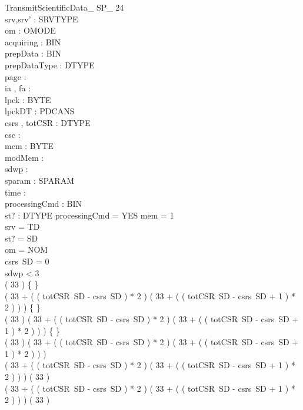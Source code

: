 \begin{schema}{TransmitScientificData\_ SP\_ 24}\\
 srv,srv' : SRVTYPE \\
 om : OMODE \\
 acquiring : BIN \\
 prepData : BIN \\
 prepDataType : DTYPE \\
 page : \nat \\
 ia , fa : \nat \\
 lpck : \seq BYTE \\
 lpckDT : PDCANS \\
 csrs , totCSR : DTYPE \fun \nat \\
 csc : \nat \\
 mem : \nat \pfun BYTE \\
 modMem : \power \nat \\
 sdwp : \nat \\
 sparam : SPARAM \fun \nat \\
 time : \nat \\
 processingCmd : BIN \\
 st? : DTYPE 
\where
 processingCmd = YES \land \dom mem = 1  \\
 srv = TD \\
 st? = SD \\
 om = NOM \\
 csrs~SD = 0 \\
 sdwp < 3 \\
 ( 33  ) \neq \{ \} \\
 ( 33 + ( ( totCSR~SD - csrs~SD ) * 2 ) \upto ( 33 + ( ( totCSR~SD - csrs~SD + 1 ) * 2 ) ) ) \neq \{ \} \\
 ( 33  ) \cap ( 33 + ( ( totCSR~SD - csrs~SD ) * 2 ) \upto ( 33 + ( ( totCSR~SD - csrs~SD + 1 ) * 2 ) ) ) \neq \{ \} \\
 \lnot ( 33  ) \subseteq ( 33 + ( ( totCSR~SD - csrs~SD ) * 2 ) \upto ( 33 + ( ( totCSR~SD - csrs~SD + 1 ) * 2 ) ) ) \\
 \lnot ( 33 + ( ( totCSR~SD - csrs~SD ) * 2 ) \upto ( 33 + ( ( totCSR~SD - csrs~SD + 1 ) * 2 ) ) ) \subseteq ( 33  ) \\
 ( 33 + ( ( totCSR~SD - csrs~SD ) * 2 ) \upto ( 33 + ( ( totCSR~SD - csrs~SD + 1 ) * 2 ) ) ) \neq ( 33  )
\end{schema}
